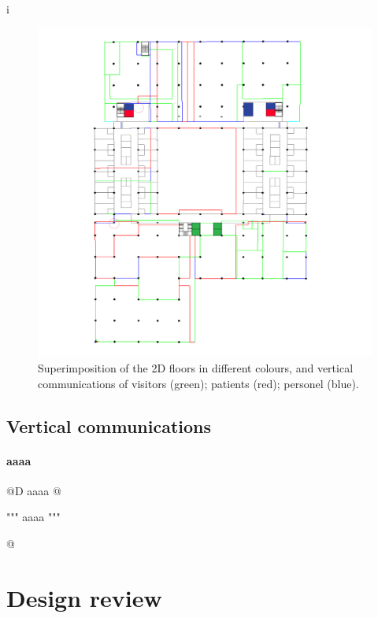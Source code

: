 i\documentclass[11pt,oneside]{article}    %
\begin{document}
\begin{figure}[htbp] %
   \centering
   \includegraphics[width=\linewidth]{images/planupdate} 
   \caption{Superimposition of the 2D floors in different colours, and vertical communications of visitors (green); patients (red); personel (blue).}
   \label{fig:example}
\end{figure}


\subsection{Vertical communications}


\paragraph{aaaa}
@D aaaa
@{""" aaaa """

@}

\section{Design review}
\end{document}
